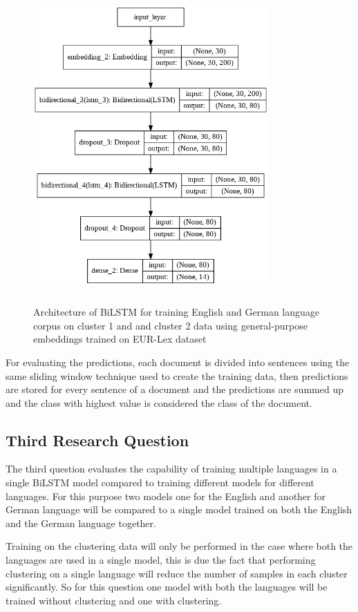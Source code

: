 \begin{figure}[!ht]
    \centering
    \includegraphics[width=9cm, height=12cm]{pics/LSTM_LEGALEMB_CLUSTER_1.png}
    \captionsetup{justification=centering,margin=2cm}
    \caption{Architecture of \gls{BiLSTM} for training English and German language corpus on cluster 1 and and cluster 2 data using general-purpose embeddings trained on EUR-Lex dataset}
    \label{fig:LegalEmbCluster}
\end{figure}

For evaluating the predictions, each document is divided into sentences using the same sliding window technique used to create the training data, then predictions are stored for every sentence of a document and the predictions are summed up and the class with highest value is considered the class of the document. 

\subsection{Third Research Question}
The third question evaluates the capability of training multiple languages in a single \gls{BiLSTM} model compared to training different models for different languages. For this purpose two models one for the English and another for German language will be compared to a single model trained on both the English and the German language together.

Training on the clustering data will only be performed in the case where both the languages are used in a single model, this is due the fact that performing clustering on a single language will reduce the number of samples in each cluster significantly. So for this question one model with both the languages will be trained without clustering and one with clustering. 

